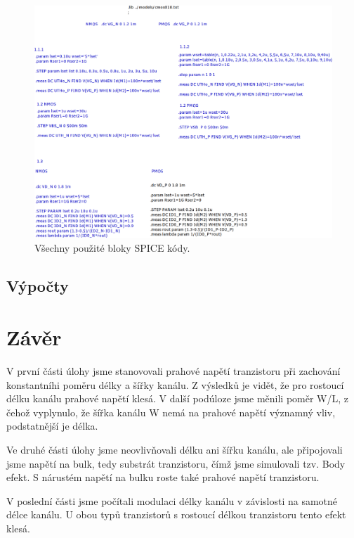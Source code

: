 \documentclass{protokol}
\begin{document}
  \begin{figure}[h!]
    \centering
    \includegraphics[width=\textwidth]{img/spice.png}
    \caption{Všechny použité bloky SPICE kódy.}
    \label{fig:img-spice-png}
  \end{figure}


  \clearpage
\subsection{Výpočty }



\section{Závěr}
  V první části úlohy jsme stanovovali prahové napětí tranzistoru při zachování konstantníhi poměru délky a šířky kanálu. Z výsledků je vidět, že pro rostoucí délku kanálu prahové napětí klesá. V další podúloze jsme měnili poměr W/L, z čehož vyplynulo, že šířka kanálu W nemá na prahové napětí významný vliv, podstatnější je délka.

  Ve druhé části úlohy jsme neovlivňovali délku ani šířku kanálu, ale připojovali jsme napětí na bulk, tedy substrát tranzistoru, čímž jsme simulovali tzv. Body efekt. S nárustém napětí na bulku roste také prahové napětí tranzistoru. 

  V poslední části jsme počítali modulaci délky kanálu v závislosti na samotné délce kanálu. U obou typů tranzistorů s rostoucí délkou tranzistoru tento efekt klesá.

\end{document}
